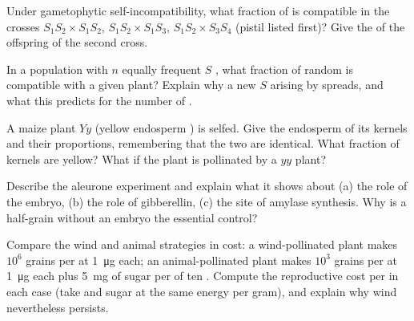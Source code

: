 \begin{exercise}[$\star\star$]\label{exo:b2:angiosperm-reproduction:6}
Under gametophytic self-incompatibility, what fraction of  is
compatible in the crosses $S_1S_2\times S_1S_2$, $S_1S_2\times
S_1S_3$, $S_1S_2\times S_3S_4$ (pistil listed first)? Give the
 of the offspring of the second cross.
\end{exercise}

\begin{exercise}[$\star\star$]\label{exo:b2:angiosperm-reproduction:7}
In a population with $n$ equally frequent $S$ , what fraction
of random  is compatible with a given plant? Explain why a new
$S$  arising by  spreads, and what this predicts for
the number of .
\end{exercise}

\begin{exercise}[$\star\star$]\label{exo:b2:angiosperm-reproduction:8}
A maize plant  $Yy$ (yellow endosperm ) is
selfed. Give the endosperm  of its kernels and their
proportions, remembering that the two  are identical.
What fraction of kernels are yellow? What if the plant is pollinated
by a $yy$ plant?
\end{exercise}

\begin{exercise}[$\star\star$]\label{exo:b2:angiosperm-reproduction:9}
Describe the aleurone experiment and explain what it shows about
(a) the role of the embryo, (b) the role of gibberellin, (c) the
site of amylase synthesis. Why is a half-grain without an embryo the
essential control?
\end{exercise}

\begin{exercise}[$\star\star\star$]\label{exo:b2:angiosperm-reproduction:10}
Compare the wind and animal strategies in cost: a wind-pollinated
plant makes $10^{6}$ grains per  at \qty{1}{\micro g} each; an
animal-pollinated plant makes $10^{3}$ grains per  at
\qty{1}{\micro g} each plus \qty{5}{mg} of  sugar per 
of ten . Compute the reproductive cost per  in each case
(take  and sugar at the same energy per gram), and explain why
wind  nevertheless persists.
\end{exercise}


